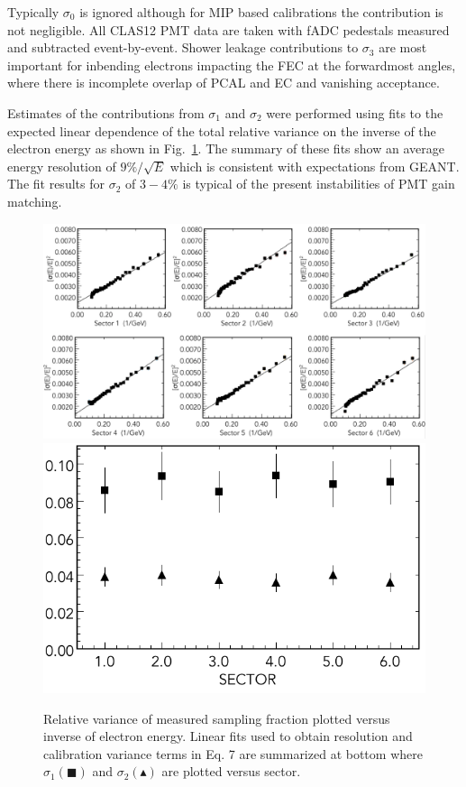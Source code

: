 Typically $\sigma_0$ is ignored although for MIP based calibrations the contribution is not negligible.  All CLAS12 PMT data are taken with fADC pedestals measured and subtracted event-by-event.  Shower leakage contributions to $\sigma_3$ are most important for inbending electrons impacting the FEC at the forwardmost angles, where there is incomplete overlap of PCAL and EC and vanishing acceptance.  

Estimates of the contributions from $\sigma_1$ and $\sigma_2$ were performed using fits to the expected linear dependence of the total relative variance on the inverse of the electron energy as shown in Fig.~\ref{fig:S10_1_1}.  The summary of these fits show an average energy resolution of $9\%/\sqrt{E}$ which is consistent with expectations from GEANT.   The fit results for $\sigma_2$ of $3-4\%$ is typical of the present instabilities of PMT gain matching.
 
\begin{figure}[hbt]
\centering
\includegraphics[width=1.0\columnwidth,keepaspectratio]{img/S10_1_1.png}
\includegraphics[width=0.5\columnwidth,keepaspectratio]{img/S10_1_2.png}
\caption[]{Relative variance of measured sampling fraction plotted versus inverse of electron energy.  Linear fits used to obtain resolution and calibration variance terms in Eq. 7 are summarized at bottom where $\sigma_1 (\blacksquare)$ and $\sigma_2 (\blacktriangle)$ are plotted versus sector.}
\label{fig:S10_1_1}
\end{figure}

